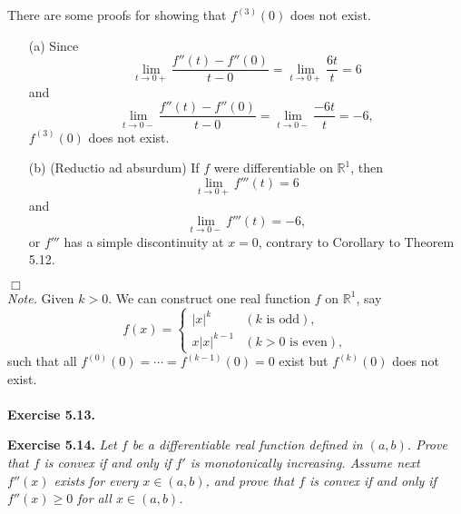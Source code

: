 \documentclass{article}
\begin{document}
\begin{enumerate}
  There are some proofs for showing that $f^{(3)} (0)$ does not exist.
  \begin{enumerate}
  \item[(a)]
  Since
  \[
    \lim_{t \to 0+} \frac{f''(t) - f''(0)}{t - 0}
    = \lim_{t \to 0+} \frac{6t}{t} = 6
  \]
  and
  \[
    \lim_{t \to 0-} \frac{f''(t) - f''(0)}{t - 0}
    = \lim_{t \to 0-} \frac{-6t}{t} = -6,
  \]
  $f^{(3)} (0)$ does not exist.

  \item[(b)]
  (Reductio ad absurdum)
  If $f$ were differentiable on $\mathbb{R}^1$,
  then
  \[
    \lim_{t \to 0+} f'''(t) = 6
  \]
  and
  \[
    \lim_{t \to 0-} f'''(t) = -6,
  \]
  or $f'''$ has a simple discontinuity at $x = 0$,
  contrary to Corollary to Theorem 5.12.
  \end{enumerate}
\end{enumerate}
$\Box$ \\

\emph{Note.}
Given $k > 0$.
We can construct one real function $f$ on $\mathbb{R}^1$, say
  \begin{equation*}
    f(x) =
    \begin{cases}
      |x|^k      & (\text{$k$ is odd}), \\
      x|x|^{k-1} & (\text{$k > 0$ is even}),
    \end{cases}
  \end{equation*}
such that
all $f^{(0)}(0) = \cdots = f^{(k-1)}(0) = 0$ exist but $f^{(k)}(0)$ does not exist.
\\\\






\textbf{Exercise 5.13.}






\textbf{Exercise 5.14.}
\emph{Let $f$ be a differentiable real function defined in $(a,b)$.
Prove that $f$ is convex if and only if $f'$ is monotonically increasing.
Assume next $f''(x)$ exists for every $x \in (a,b)$,
and prove that $f$ is convex if and only if $f''(x) \geq 0$ for all $x \in (a,b)$.} \\
\end{document}
